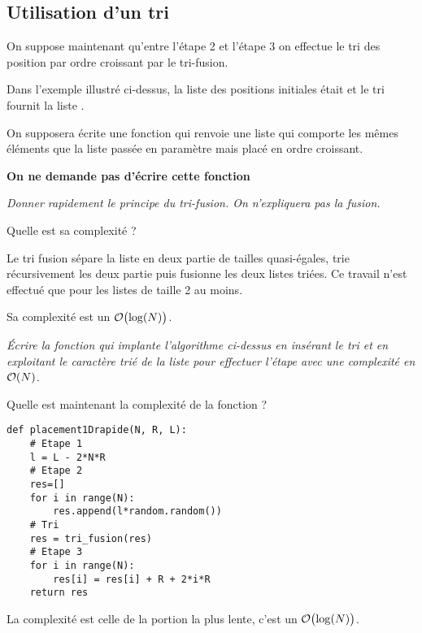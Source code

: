 \subsection{Utilisation d'un tri}
On suppose maintenant qu'entre l'étape 2 et l'étape 3 on effectue le tri des position par ordre croissant par le tri-fusion.

Dans l'exemple illustré ci-dessus, la liste des positions initiales était 
\type{[2.5, 4.7, 1.0, 4.0, 1.7]} et le tri fournit la liste 
\type{[1.0, 1.7, 2.5, 4.0, 4.7]}.

On supposera écrite une fonction  qui renvoie une liste qui comporte les mêmes éléments que la liste passée en paramètre mais placé en ordre croissant.

{\bf On ne demande pas d'écrire cette fonction}
\begin{Exercise}\it 
Donner rapidement le principe du tri-fusion. On n'expliquera pas la fusion.

Quelle est sa complexité ?
\end{Exercise}
\begin{Answer}
Le tri fusion sépare la liste en deux partie de tailles quasi-égales, trie récursivement les deux partie puis fusionne les deux listes triées. Ce travail n'est effectué que pour les listes de taille 2 au moins.

Sa complexité est un ${\cal O}\bigl(\log(N)\bigr)$.
\end{Answer}
\begin{Exercise}\it 
Écrire la fonction 
qui implante l'algorithme ci-dessus en insérant le tri et en exploitant le caractère trié de la liste pour effectuer l'étape avec une complexité en ${\cal O}(N)$.

Quelle est maintenant la complexité de la fonction ?
\end{Exercise}
\begin{Answer}
\begin{lstlisting}
def placement1Drapide(N, R, L):
    # Etape 1
    l = L - 2*N*R
    # Etape 2
    res=[]
    for i in range(N):
        res.append(l*random.random())
    # Tri
    res = tri_fusion(res)
    # Etape 3
    for i in range(N):
        res[i] = res[i] + R + 2*i*R
    return res
\end{lstlisting}

La complexité est celle de la portion la plus lente, c'est un ${\cal O}\bigl(\log(N)\bigr)$.
\end{Answer}
